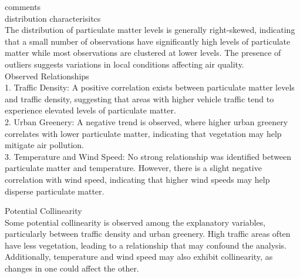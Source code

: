 \documentclass[12pt,halfline,a4paper,]{ouparticle}
\begin{document}
comments\\
distribution characterisitcs\\
The distribution of particulate matter levels is generally right-skewed,
indicating that a small number of observations have significantly high
levels of particulate matter while most observations are clustered at
lower levels. The presence of outliers suggests variations in local
conditions affecting air quality.\\
Observed Relationships\\
1. Traffic Density: A positive correlation exists between particulate
matter levels and traffic density, suggesting that areas with higher
vehicle traffic tend to experience elevated levels of particulate
matter.\\
2. Urban Greenery: A negative trend is observed, where higher urban
greenery correlates with lower particulate matter, indicating that
vegetation may help mitigate air pollution.\\
3. Temperature and Wind Speed: No strong relationship was identified
between particulate matter and temperature. However, there is a slight
negative correlation with wind speed, indicating that higher wind speeds
may help disperse particulate matter.

Potential Collinearity\\
Some potential collinearity is observed among the explanatory variables,
particularly between traffic density and urban greenery. High traffic
areas often have less vegetation, leading to a relationship that may
confound the analysis. Additionally, temperature and wind speed may also
exhibit collinearity, as changes in one could affect the other.
\end{document}
